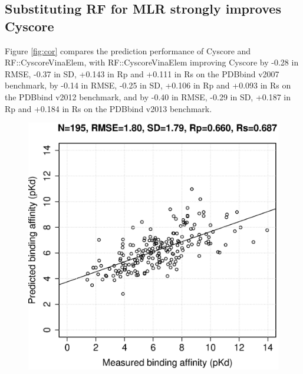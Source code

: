 \documentclass[journal=jacsat,manuscript=article]{achemso}
\begin{document}
\subsection{Substituting RF for MLR strongly improves Cyscore}

Figure \ref{fig:cor} compares the prediction performance of Cyscore and RF::CyscoreVinaElem, with RF::CyscoreVinaElem improving Cyscore by -0.28 in RMSE, -0.37 in SD, +0.143 in Rp and +0.111 in Rs on the PDBbind v2007 benchmark, by -0.14 in RMSE, -0.25 in SD, +0.106 in Rp and +0.093 in Rs on the PDBbind v2012 benchmark, and by -0.40 in RMSE, -0.29 in SD, +0.187 in Rp and +0.184 in Rs on the PDBbind v2013 benchmark.

\begin{figure}[ht!]
\includegraphics[width=\linewidth]{../rfcyscore/x4/mlr/trn-247-tst-195-yp.eps}
\endminipage
{}

\end{figure}
\end{document}
